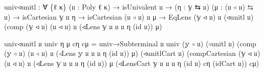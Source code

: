 \documentclass[
  11pt,
  oneside,
  article]{memoir}
\newenvironment{Shaded}{}{}
\newcommand{\NormalTok}[1]{#1}
\newcommand{\OtherTok}[1]{\textcolor[rgb]{0.00,0.44,0.13}{#1}}
\theoremstyle{definition}
\theoremstyle{plain}
\newcommand{\0}{\textsf{0}}
\newcommand{\1}{\tn{\textsf{1}}}
\begin{document}
\begin{Shaded}
\begin{Highlighting}[]
\NormalTok{univ◃unitl }\OtherTok{:} \OtherTok{∀} \OtherTok{\{}\NormalTok{ℓ κ}\OtherTok{\}} \OtherTok{(}\NormalTok{𝔲 }\OtherTok{:}\NormalTok{ Poly ℓ κ}\OtherTok{)} \OtherTok{→}\NormalTok{ isUnivalent 𝔲}
             \OtherTok{→} \OtherTok{(}\NormalTok{η }\OtherTok{:}\NormalTok{ 𝕪 ⇆ 𝔲}\OtherTok{)} \OtherTok{(}\NormalTok{μ }\OtherTok{:} \OtherTok{(}\NormalTok{𝔲 ◃ 𝔲}\OtherTok{)}\NormalTok{ ⇆ 𝔲}\OtherTok{)}
             \OtherTok{→}\NormalTok{ isCartesian 𝕪 𝔲 η }\OtherTok{→}\NormalTok{ isCartesian }\OtherTok{(}\NormalTok{𝔲 ◃ 𝔲}\OtherTok{)}\NormalTok{ 𝔲 μ}
             \OtherTok{→}\NormalTok{ EqLens }\OtherTok{(}\NormalTok{𝕪 ◃ 𝔲}\OtherTok{)}\NormalTok{ 𝔲 }
                      \OtherTok{(}\NormalTok{◃unitl 𝔲}\OtherTok{)}
                      \OtherTok{(}\NormalTok{comp }\OtherTok{(}\NormalTok{𝕪 ◃ 𝔲}\OtherTok{)} \OtherTok{(}\NormalTok{𝔲 ◃ 𝔲}\OtherTok{)}\NormalTok{ 𝔲}
                            \OtherTok{(}\NormalTok{◃Lens 𝕪 𝔲 𝔲 𝔲 η }\OtherTok{(}\NormalTok{id 𝔲}\OtherTok{))}\NormalTok{ μ}\OtherTok{)}
                            
\NormalTok{univ◃unitl 𝔲 univ η μ cη cμ }\OtherTok{=}
\NormalTok{    univ→Subterminal }
\NormalTok{        𝔲 univ }\OtherTok{(}\NormalTok{𝕪 ◃ 𝔲}\OtherTok{)} \OtherTok{(}\NormalTok{◃unitl 𝔲}\OtherTok{)}
        \OtherTok{(}\NormalTok{comp }\OtherTok{(}\NormalTok{𝕪 ◃ 𝔲}\OtherTok{)} \OtherTok{(}\NormalTok{𝔲 ◃ 𝔲}\OtherTok{)}\NormalTok{ 𝔲 }
              \OtherTok{(}\NormalTok{◃Lens 𝕪 𝔲 𝔲 𝔲 η }\OtherTok{(}\NormalTok{id 𝔲}\OtherTok{))}\NormalTok{ μ}\OtherTok{)} 
        \OtherTok{(}\NormalTok{◃unitlCart 𝔲}\OtherTok{)} 
        \OtherTok{(}\NormalTok{compCartesian }\OtherTok{(}\NormalTok{𝕪 ◃ 𝔲}\OtherTok{)} \OtherTok{(}\NormalTok{𝔲 ◃ 𝔲}\OtherTok{)}\NormalTok{ 𝔲}
                       \OtherTok{(}\NormalTok{◃Lens 𝕪 𝔲 𝔲 𝔲 η }\OtherTok{(}\NormalTok{id 𝔲}\OtherTok{))}\NormalTok{ μ }
                       \OtherTok{(}\NormalTok{◃LensCart 𝕪 𝔲 𝔲 𝔲 η }\OtherTok{(}\NormalTok{id 𝔲}\OtherTok{)} 
\NormalTok{                                  cη }\OtherTok{(}\NormalTok{idCart 𝔲}\OtherTok{))}\NormalTok{ cμ}\OtherTok{)}


\end{Highlighting}
\end{Shaded}
\end{document}
